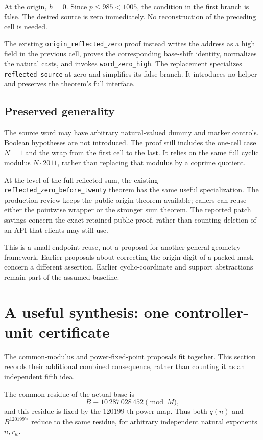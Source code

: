 \documentclass[11pt,letterpaper]{article}
\newcommand{\code}[1]{\nolinkurl{#1}}
\begin{document}
At the origin, \(h=0\). Since \(p\le985<1005\), the condition in the first branch is false. The desired source is zero immediately. No reconstruction of the preceding cell is needed.

The existing \code{origin_reflected_zero} proof instead writes the address as a high field in the previous cell, proves the corresponding base-shift identity, normalizes the natural casts, and invokes \code{word_zero_high}. The replacement specializes \code{reflected_source} at zero and simplifies its false branch. It introduces no helper and preserves the theorem's full interface.

\subsection{Preserved generality}

The source word may have arbitrary natural-valued dummy and marker controls. Boolean hypotheses are not introduced. The proof still includes the one-cell case \(N=1\) and the wrap from the first cell to the last. It relies on the same full cyclic modulus \(N\cdot2011\), rather than replacing that modulus by a coprime quotient.

At the level of the full reflected sum, the existing \code{reflected_zero_before_twenty} theorem has the same useful specialization. The production review keeps the public origin theorem available; callers can reuse either the pointwise wrapper or the stronger sum theorem. The reported patch savings concern the exact retained public proof, rather than counting deletion of an API that clients may still use.

This is a small endpoint reuse, not a proposal for another general geometry framework. Earlier proposals about correcting the origin digit of a packed mask concern a different assertion. Earlier cyclic-coordinate and support abstractions remain part of the assumed baseline.

\section{A useful synthesis: one controller-unit certificate}\label{sec:joint}

The common-modulus and power-fixed-point proposals fit together. This section records their additional combined consequence, rather than counting it as an independent fifth idea.

The common residue of the actual base is
\[
 B\equiv10\,287\,028\,452\pmod M,
\]
and this residue is fixed by the \(120199\)-th power map. Thus both \(q(n)\) and \(B^{120199^{r_w}}\) reduce to the same residue, for arbitrary independent natural exponents \(n,r_w\).
\end{document}
